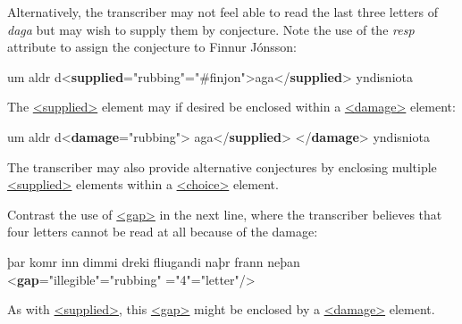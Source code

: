 Alternatively, the transcriber may not feel able to read the last three letters of \textit{daga} but may wish to supply them by conjecture. Note the use of the {\itshape resp} attribute to assign the conjecture to Finnur Jónsson: \par\bgroup{}\exampleFont \begin{shaded}\noindent\mbox{}um aldr d{<\textbf{supplied}\hspace*{1em}{reason}="{rubbing}"\hspace*{1em}{resp}="{\#finjon}">}aga{</\textbf{supplied}>}\mbox{}\newline 
 yndisniota\end{shaded}\egroup\par \noindent  The \hyperref[TEI.supplied]{<supplied>} element may if desired be enclosed within a \hyperref[TEI.damage]{<damage>} element: \par\bgroup{}\exampleFont \begin{shaded}\noindent\mbox{}um aldr d{<\textbf{damage}\hspace*{1em}{agent}="{rubbing}">}\mbox{}\newline 
{}aga{</\textbf{supplied}>}\mbox{}\newline 
{</\textbf{damage}>}\mbox{}\newline 
 yndisniota\end{shaded}\egroup\par \noindent  The transcriber may also provide alternative conjectures by enclosing multiple \hyperref[TEI.supplied]{<supplied>} elements within a \hyperref[TEI.choice]{<choice>} element.\par
Contrast the use of \hyperref[TEI.gap]{<gap>} in the next line, where the transcriber believes that four letters cannot be read at all because of the damage: \par\bgroup{}\exampleFont \begin{shaded}\noindent\mbox{}þar komr inn dimmi\mbox{}\newline 
 dreki fliugandi naþr frann neþan {<\textbf{gap}\hspace*{1em}{reason}="{illegible}"\hspace*{1em}{agent}="{rubbing}"\mbox{}\newline 
\hspace*{1em}{quantity}="{4}"\hspace*{1em}{unit}="{letter}"/>}\end{shaded}\egroup\par \noindent  As with \hyperref[TEI.supplied]{<supplied>}, this \hyperref[TEI.gap]{<gap>} might be enclosed by a \hyperref[TEI.damage]{<damage>} element.\par

